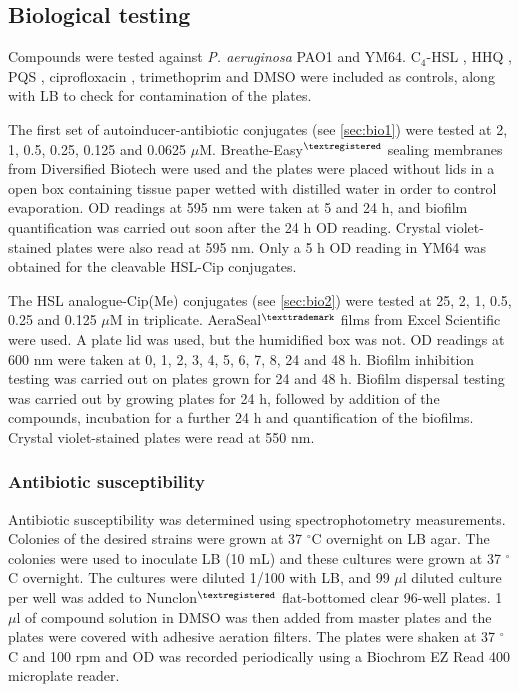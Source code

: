 \subsection{Biological testing\label{sec:exp_bio}}

Compounds were tested against \textit{P. aeruginosa} PAO1\cite{Stover2000} and YM64\cite{Morita2001}.
C$_4$-HSL , HHQ , PQS , ciprofloxacin , trimethoprim  and DMSO were included as controls, along with LB to check for contamination of the plates.

The first set of autoinducer-antibiotic conjugates (see \ref{sec:bio1}) were tested at 2, 1, 0.5, 0.25, 0.125 and 0.0625 $\mu$M. 
Breathe-Easy$^{\tiny{\textregistered}}$ sealing membranes from Diversified Biotech were used and the plates were placed without lids in a open box containing tissue paper wetted with distilled water in order to control evaporation. 
OD readings at 595 nm were taken at 5 and 24 h, and biofilm quantification was carried out soon after the 24 h OD reading. Crystal violet-stained plates were also read at 595 nm.
Only a 5 h OD reading in YM64 was obtained for the cleavable HSL-Cip conjugates.

The HSL analogue-Cip(Me) conjugates (see \ref{sec:bio2}) were tested at 25, 2, 1, 0.5, 0.25 and 0.125 $\mu$M in triplicate.
AeraSeal$^{\tiny{\texttrademark}}$ films from Excel Scientific were used. A plate lid was used, but the humidified box was not.
OD readings at 600 nm were taken at 0, 1, 2, 3, 4, 5, 6, 7, 8, 24 and 48 h. 
Biofilm inhibition testing was carried out on plates grown for 24 and 48 h. Biofilm dispersal testing was carried out by growing plates for 24 h, followed by addition of the compounds, incubation for a further 24 h and quantification of the biofilms. Crystal violet-stained plates were read at 550 nm.

\subsubsection{Antibiotic susceptibility\label{sec:ABsus}}

Antibiotic susceptibility was determined using spectrophotometry measurements.
Colonies of the desired strains were grown at 37 $^{\circ}$C overnight on LB agar.
The colonies were used to inoculate LB (10 mL) and these cultures were grown at 37 $^{\circ}$C overnight. 
The cultures were diluted 1/100 with LB, and 99 $\mu$l diluted culture per well was added to Nunclon$^{\tiny{\textregistered}}$ flat-bottomed clear 96-well plates. 1 $\mu$l of compound solution in DMSO was then added from master plates and the plates were covered with adhesive aeration filters. 
The plates were shaken at 37 $^{\circ}$C and 100 rpm and OD was recorded periodically using a Biochrom EZ Read 400 microplate reader.

